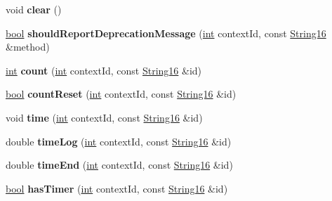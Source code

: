 \begin{DoxyCompactItemize}
\mbox{\label{classv8__inspector_1_1V8ConsoleMessageStorage_a2a9fab243458ab6981a42b70f253bac9}} 
void {\bfseries clear} ()
\item 
\mbox{\label{classv8__inspector_1_1V8ConsoleMessageStorage_a4f2381d880b8790484dc97a130dea39c}} 
\mbox{\hyperlink{classbool}{bool}} {\bfseries should\+Report\+Deprecation\+Message} (\mbox{\hyperlink{classint}{int}} context\+Id, const \mbox{\hyperlink{classv8__inspector_1_1String16}{String16}} \&method)
\item 
\mbox{\label{classv8__inspector_1_1V8ConsoleMessageStorage_af39fc693925399d67822efd065ce5a4f}} 
\mbox{\hyperlink{classint}{int}} {\bfseries count} (\mbox{\hyperlink{classint}{int}} context\+Id, const \mbox{\hyperlink{classv8__inspector_1_1String16}{String16}} \&id)
\item 
\mbox{\label{classv8__inspector_1_1V8ConsoleMessageStorage_a9a818bcf85efcbeb1e99c3d26972832d}} 
\mbox{\hyperlink{classbool}{bool}} {\bfseries count\+Reset} (\mbox{\hyperlink{classint}{int}} context\+Id, const \mbox{\hyperlink{classv8__inspector_1_1String16}{String16}} \&id)
\item 
\mbox{\label{classv8__inspector_1_1V8ConsoleMessageStorage_a20747feb328bdcf8f241c1676d86e16b}} 
void {\bfseries time} (\mbox{\hyperlink{classint}{int}} context\+Id, const \mbox{\hyperlink{classv8__inspector_1_1String16}{String16}} \&id)
\item 
\mbox{\label{classv8__inspector_1_1V8ConsoleMessageStorage_a29b89560c03354c7b94d43fce1afbd0d}} 
double {\bfseries time\+Log} (\mbox{\hyperlink{classint}{int}} context\+Id, const \mbox{\hyperlink{classv8__inspector_1_1String16}{String16}} \&id)
\item 
\mbox{\label{classv8__inspector_1_1V8ConsoleMessageStorage_ac6c06d55e45474542292c7f9206507d3}} 
double {\bfseries time\+End} (\mbox{\hyperlink{classint}{int}} context\+Id, const \mbox{\hyperlink{classv8__inspector_1_1String16}{String16}} \&id)
\item 
\mbox{\label{classv8__inspector_1_1V8ConsoleMessageStorage_a383bf85fef5694b8d739891d9aeef2c2}} 
\mbox{\hyperlink{classbool}{bool}} {\bfseries has\+Timer} (\mbox{\hyperlink{classint}{int}} context\+Id, const \mbox{\hyperlink{classv8__inspector_1_1String16}{String16}} \&id)
\end{DoxyCompactItemize}


